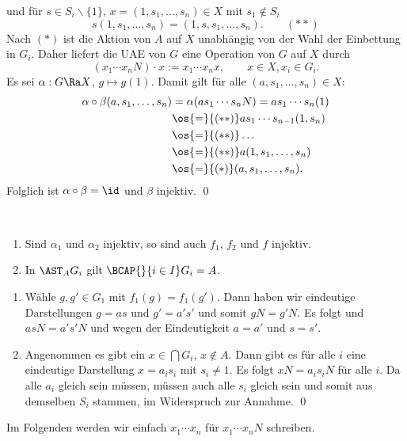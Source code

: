 und für $s\in S_i\backslash\{1\}$, $x=(1,s_1,\ldots,s_n)\in X$ mit
$s_1\not\in S_i$
\[
s(1,s_1,\ldots,s_n) = (1,s,s_1,\ldots,s_n). \qquad (**)
\]
Nach $(*)$ ist die Aktion von $A$ auf $X$ unabhängig von der Wahl
der Einbettung in $G_i$. Daher liefert die UAE von $G$ eine
Operation von $G$ auf $X$ durch
\[
(x_1\cdots x_n N)\cdot x := x_1\cdots x_n x,\qquad x\in X, x_i\in G_i.
\]
Es sei $\alpha:G\Ra X$, $g\mapsto g (1)$.
Damit gilt für alle $(a,s_1,\ldots,s_n)\in X$:
\begin{align*}
\alpha\circ\beta(a,s_1,\ldots,s_n)
&= \alpha(a s_1\cdots s_n N) = a s_1\cdots s_n (1) \\
&\os{=}{(**)} a s_1\cdots s_{n-1}(1,s_n) \\
&\os{=}{(**)} \ldots \\
&\os{=}{(**)} a(1,s_1,\ldots,s_n) \\
&\os{=}{(*)} (a,s_1,\ldots,s_n).
\end{align*}
Folglich ist $\alpha\circ\beta=\id$ und $\beta$ injektiv.
\qed

\FOLG\
\begin{enumerate}
\item Sind $\alpha_1$ und $\alpha_2$ injektiv, so sind auch
$f_1$, $f_2$ und $f$ injektiv.
\item In $\AST_{A} G_i$ gilt $\BCAP{}{i\in I} G_i = A$.
\end{enumerate}
\bew
\begin{enumerate}
\item Wähle $g,g'\in G_1$ mit $f_1(g)=f_1(g')$.
Dann haben wir eindeutige Darstellungen $g=as$ und $g'=a's'$
und somit $gN=g'N$. Es folgt und $asN=a's'N$ und wegen der
Eindeutigkeit $a=a'$ und $s=s'$.
\item Angenommen es gibt ein $x\in \bigcap G_i$, $x\not\in A$.
Dann gibt es für alle $i$ eine eindeutige Darstellung
$x=a_i s_i$ mit $s_i\neq 1$.
Es folgt $xN=a_i s_i N$ für alle $i$.
Da alle $a_i$ gleich sein müssen, müssen auch alle $s_i$ gleich sein
und somit aus demselben $S_i$ stammen, im Widerspruch zur Annahme.
\qed
\end{enumerate}

Im Folgenden werden wir einfach $x_1\cdots x_n$ für
$x_1\cdots x_n N$ schreiben.

